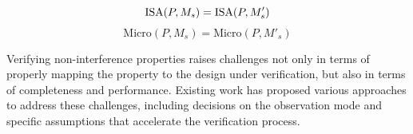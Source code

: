 {\begin{equation}
\vspace*{-.3em}
\label{eq:isatrace}
\text{ISA}(P, M_s) = \text{ISA}(P, M'_s)
\end{equation}
\begin{equation}
\label{eq:microtrace}
\text{Micro}(P, M_s) = \text{Micro}(P, M'_s)
\end{equation}

Verifying non-interference properties raises challenges not only in terms of properly mapping the property to the design under verification, but also in terms of completeness and performance.
Existing work has proposed various approaches to address these challenges, including decisions on the observation mode and specific assumptions that accelerate the verification process.
}








